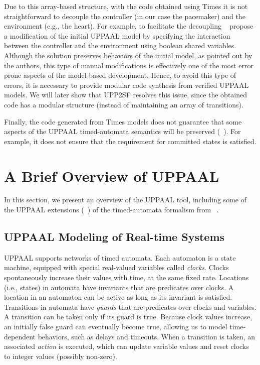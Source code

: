 Due to this array-based structure, with the code obtained using Times it is not straightforward to decouple the controller (in our case the pacemaker) and the environment (e.g., the heart). For example, to facilitate the decoupling ~\cite{kim_emsoft11} propose a modification of the initial UPPAAL model by specifying the interaction between the controller and the environment using boolean shared variables. 
Although the solution preserves behaviors of the initial model, as pointed out by the authors, this type of manual modifications is effectively one of the most error prone aspects of the model-based development. Hence, to avoid this type of errors, it is necessary to provide modular code synthesis from verified UPPAAL models. We will later show  that UPP2SF resolves this issue, since the obtained code has a modular structure (instead of maintaining an array of transitions).

Finally, the code generated from Times models does not guarantee that some aspects of the UPPAAL timed-automata semantics will be preserved (~\cite{anaheed}). For example, it does not ensure that the requirement for committed states is satisfied. 


\section{A Brief Overview of UPPAAL}
\label{sec:uppaal}

In this section, we present an overview of the UPPAAL tool, including some of the UPPAAL extensions (~\cite{uppaal,uppaal_tut,uppaal_wang}) of the timed-automata formalism from ~\cite{timed-aut}. 

\subsection{UPPAAL Modeling of Real-time Systems}

UPPAAL supports networks of timed automata. Each automaton is a state machine, equipped with special real-valued variables called \textit{clocks}. Clocks spontaneously increase their values with time, at the same fixed rate. Locations (i.e., states) in automata have invariants that are predicates over clocks. A location in an automaton can be active as long as its invariant is satisfied. Transitions in automata have \textit{guards} that are predicates over clocks and variables.  A transition can be taken only if its guard is true.  Because clock values increase, an initially false guard can eventually become true, allowing us to model time-dependent behaviors, such as delays and timeouts.  When a transition is taken, an associated \textit{action} is executed, which can update variable values and reset clocks to integer values (possibly non-zero). 

